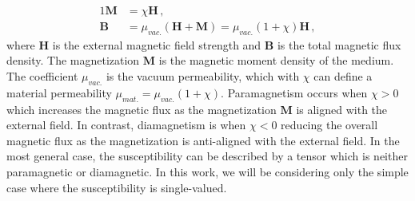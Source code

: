 \documentclass[
aps,
pra,
twocolumn,
showpacs,
preprintnumbers,
amsmath,
amssymb,
footinbib
]{revtex4-2}
\begin{document}
\begin{alignat}{1}
  \label{CHIeq01} \textbf{M}&=\chi\textbf{H}\,,\\
  \label{CHIeq02} \textbf{B}&=\mu_{vac.}\left(\textbf{H}+\textbf{M}\right)=\mu_{vac.}\left(1+\chi\right)\textbf{H}\,,
\end{alignat}
where $\textbf{H}$ is the external magnetic field strength and $\textbf{B}$ is the total magnetic flux density. The magnetization $\textbf{M}$ is the magnetic moment density of the medium. The coefficient $\mu_{vac.}$ is the vacuum permeability, which with $\chi$ can define a material permeability $\mu_{mat.}=\mu_{vac.}(1+\chi)$. Paramagnetism occurs when $\chi>0$ which increases the magnetic flux as the magnetization $\textbf{M}$ is aligned with the external field. In contrast, diamagnetism is when $\chi<0$ reducing the overall magnetic flux as the magnetization is anti-aligned with the external field. In the most general case, the susceptibility can be described by a tensor which is neither paramagnetic or diamagnetic. In this work, we will be considering only the simple case where the susceptibility is single-valued.
\end{document}
